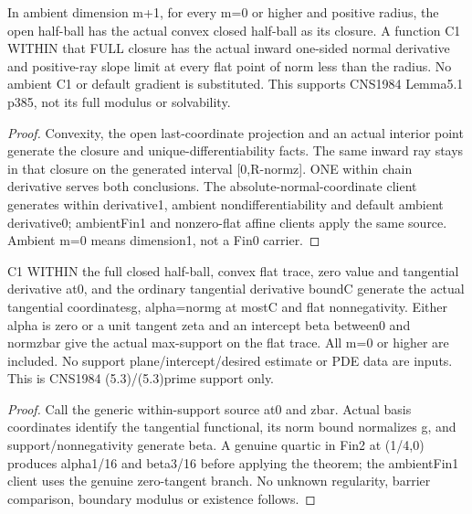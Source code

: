 \begin{lemma}
  \label{lem:halfball-within-normal}
  \leanok
  In ambient dimension m+1, for every m=0 or higher and positive radius,
  the open half-ball has the actual convex closed half-ball as its closure.
  A function C1 WITHIN that FULL closure has the actual inward one-sided
  normal derivative and positive-ray slope limit at every flat point of
  norm less than the radius. No ambient C1 or default gradient is substituted.
  This supports CNS1984 Lemma5.1 p385, not its full modulus or solvability.
\end{lemma}
\begin{proof}
  \leanok
  Convexity, the open last-coordinate projection and an actual interior point
  generate the closure and unique-differentiability facts. The same inward
  ray stays in that closure on the generated interval [0,R-normz]. ONE within
  chain derivative serves both conclusions. The absolute-normal-coordinate
  client generates within derivative1, ambient nondifferentiability and
  default ambient derivative0; ambientFin1 and nonzero-flat affine clients
  apply the same source. Ambient m=0 means dimension1, not a Fin0 carrier.
\end{proof}

\begin{lemma}
  \label{lem:normalized-flat-support}
  \leanok
  C1 WITHIN the full closed half-ball, convex flat trace, zero value and
  tangential derivative at0, and the ordinary tangential derivative boundC
  generate the actual tangential coordinatesg, alpha=normg at mostC and flat
  nonnegativity. Either alpha is zero or a unit tangent zeta and an intercept
  beta between0 and normzbar give the actual max-support on the flat trace.
  All m=0 or higher are included. No support plane/intercept/desired estimate
  or PDE data are inputs. This is CNS1984 (5.3)/(5.3)prime support only.
\end{lemma}
\begin{proof}
  \leanok
  Call the generic within-support source at0 and zbar. Actual basis
  coordinates identify the tangential functional, its norm bound normalizes
  g, and support/nonnegativity generate beta. A genuine quartic in Fin2 at
  (1/4,0) produces alpha1/16 and beta3/16 before applying the theorem; the
  ambientFin1 client uses the genuine zero-tangent branch. No unknown
  regularity, barrier comparison, boundary modulus or existence follows.
\end{proof}


